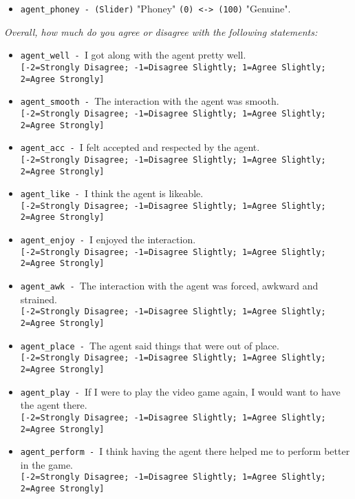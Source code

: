 \begin{description}
\begin{addmargin}[0em]{0em}
\begin{addmargin}[1em]{0em}
\begin{itemize}
            \item \verb|agent_phoney - (Slider)| "Phoney" \verb|(0) <-> (100)| "Genuine".
        \end{itemize}
        \begin{addmargin}[1em]{0em}
            \textit{Overall, how much do you agree or disagree with the following statements:}
        \end{addmargin}
        \begin{itemize}
            \item \verb|agent_well - |I got along with the agent pretty well.\\\verb|[-2=Strongly Disagree; -1=Disagree Slightly; 1=Agree Slightly; 2=Agree Strongly]|
            \item \verb|agent_smooth - |The interaction with the agent was smooth.\\\verb|[-2=Strongly Disagree; -1=Disagree Slightly; 1=Agree Slightly; 2=Agree Strongly]|
            \item \verb|agent_acc - |I felt accepted and respected by the agent.\\\verb|[-2=Strongly Disagree; -1=Disagree Slightly; 1=Agree Slightly; 2=Agree Strongly]|
            \item \verb|agent_like - |I think the agent is likeable.\\\verb|[-2=Strongly Disagree; -1=Disagree Slightly; 1=Agree Slightly; 2=Agree Strongly]|
            \item \verb|agent_enjoy - |I enjoyed the interaction.\\\verb|[-2=Strongly Disagree; -1=Disagree Slightly; 1=Agree Slightly; 2=Agree Strongly]|
            \item \verb|agent_awk - |The interaction with the agent was forced, awkward and strained.\\\verb|[-2=Strongly Disagree; -1=Disagree Slightly; 1=Agree Slightly; 2=Agree Strongly]|
            \item \verb|agent_place - |The agent said things that were out of place.\\\verb|[-2=Strongly Disagree; -1=Disagree Slightly; 1=Agree Slightly; 2=Agree Strongly]|
            \item \verb|agent_play - |If I were to play the video game again, I would want to have the agent there.\\\verb|[-2=Strongly Disagree; -1=Disagree Slightly; 1=Agree Slightly; 2=Agree Strongly]|
            \item \verb|agent_perform - |I think having the agent there helped me to perform better in the game.\\\verb|[-2=Strongly Disagree; -1=Disagree Slightly; 1=Agree Slightly; 2=Agree Strongly]|

\end{itemize}
\end{addmargin}
\end{addmargin}
\end{description}
